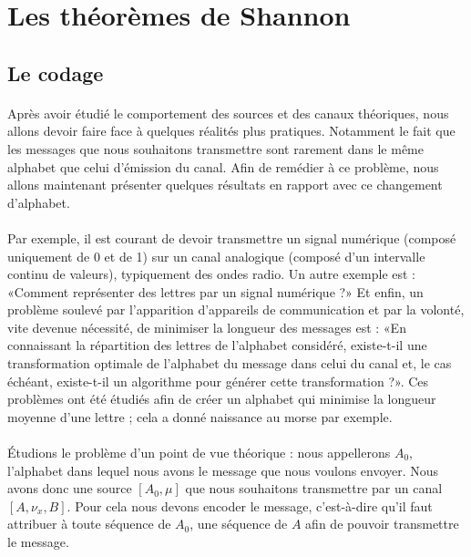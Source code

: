 \section{Les théorèmes de Shannon}

\subsection{Le codage}
	\paragraph{}
	Après avoir étudié le comportement des sources et des canaux théoriques, 
	nous allons devoir faire face à quelques réalités plus pratiques. 
	Notamment le fait que les messages que nous souhaitons transmettre sont 
	rarement dans le même alphabet que celui d'émission du canal. Afin de 
	remédier à ce problème, nous allons maintenant présenter quelques
	résultats en rapport avec ce changement d'alphabet. 
	
	\paragraph{}
	Par exemple, il est courant de devoir transmettre un signal numérique
	(composé uniquement de 0 et de 1) sur un canal analogique (composé 
	d'un intervalle continu de valeurs), typiquement des ondes radio.
	Un autre exemple est : «Comment représenter des 
	lettres par un signal numérique ?» Et enfin, un problème soulevé par 
	l'apparition d'appareils de communication et par la volonté, vite
	devenue nécessité, de minimiser la longueur des messages est :
	«En connaissant la répartition des lettres de l'alphabet considéré,
	existe-t-il une transformation optimale de l'alphabet du message
	dans celui du canal et, le cas échéant, existe-t-il un algorithme pour 
	générer cette transformation ?». Ces problèmes ont été étudiés afin de
	créer un alphabet qui minimise la longueur moyenne d'une lettre ; 
	cela a donné naissance au morse par exemple. 
	
	\paragraph{}
	Étudions le problème d'un point de vue théorique :
	nous appellerons $A_0$, l'alphabet dans lequel nous avons le message que 
	nous voulons envoyer. Nous avons donc une source $[A_0,\mu]$ que nous 
	souhaitons transmettre par un canal $[A,\nu_x,B]$. Pour cela nous devons 
	encoder le message, c'est-à-dire qu'il faut attribuer à toute séquence de 
	$A_0$, une séquence de $A$ afin de pouvoir transmettre le message.

